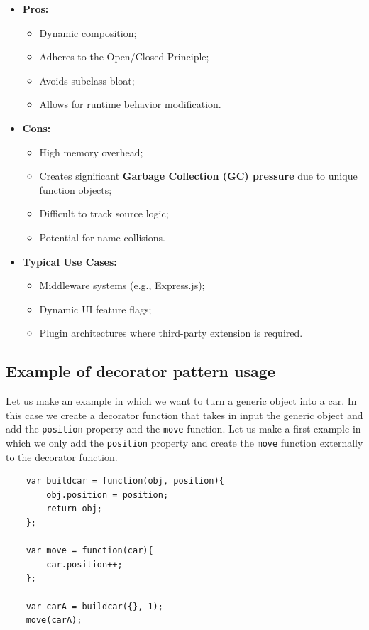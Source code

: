 \documentclass{scrbook}
\begin{document}
\begin{itemize}
    \item
        \textbf{Pros:}
        \begin{itemize}
            \item Dynamic composition;
            \item Adheres to the Open/Closed Principle;
            \item Avoids subclass bloat;
            \item Allows for runtime behavior modification.
        \end{itemize}

    \item 
        \textbf{Cons:}
        \begin{itemize}
            \item High memory overhead;
            \item Creates significant \textbf{Garbage Collection (GC) pressure} due to unique function objects;
            \item Difficult to track source logic;
            \item Potential for name collisions.
        \end{itemize}

    \item 
        \textbf{Typical Use Cases:}
        \begin{itemize}
            \item Middleware systems (e.g., Express.js);
            \item Dynamic UI feature flags;
            \item Plugin architectures where third-party extension is required.
        \end{itemize}
\end{itemize}

\subsection{Example of decorator pattern usage}

Let us make an example in which we want to turn a generic object into a car. In this case we create a decorator function that takes in input the generic object and add the \texttt{position} property and the \texttt{move} function. Let us make a first example in which we only add the \texttt{position} property and create the \texttt{move} function externally to the decorator function.

\begin{lstlisting}
    var buildcar = function(obj, position){
        obj.position = position;
        return obj;
    };
    
    var move = function(car){
        car.position++;
    };
    
    var carA = buildcar({}, 1);
    move(carA);
\end{lstlisting}
\end{document}
